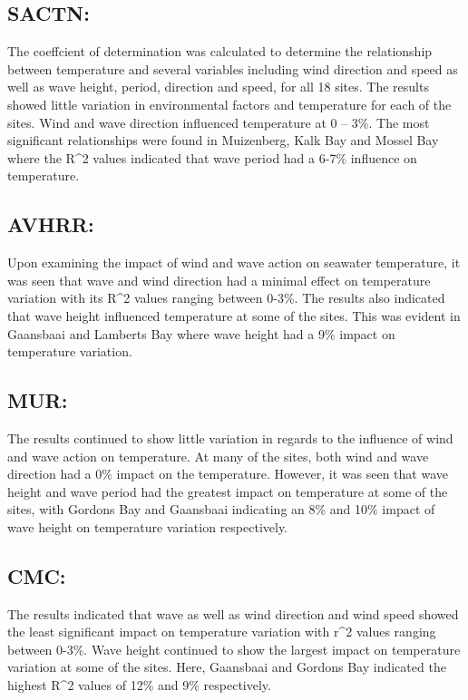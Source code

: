 \documentclass[12pt,]{article}
\begin{document}
\subsection{SACTN:}\label{sactn}

The coeffcient of determination was calculated to determine the
relationship between temperature and several variables including wind
direction and speed as well as wave height, period, direction and speed,
for all 18 sites. The results showed little variation in environmental
factors and temperature for each of the sites. Wind and wave direction
influenced temperature at 0 -- 3\%. The most significant relationships
were found in Muizenberg, Kalk Bay and Mossel Bay where the R\^{}2
values indicated that wave period had a 6-7\% influence on temperature.

\subsection{AVHRR:}\label{avhrr}

Upon examining the impact of wind and wave action on seawater
temperature, it was seen that wave and wind direction had a minimal
effect on temperature variation with its R\^{}2 values ranging between
0-3\%. The results also indicated that wave height influenced
temperature at some of the sites. This was evident in Gaansbaai and
Lamberts Bay where wave height had a 9\% impact on temperature
variation.

\subsection{MUR:}\label{mur}

The results continued to show little variation in regards to the
influence of wind and wave action on temperature. At many of the sites,
both wind and wave direction had a 0\% impact on the temperature.
However, it was seen that wave height and wave period had the greatest
impact on temperature at some of the sites, with Gordons Bay and
Gaansbaai indicating an 8\% and 10\% impact of wave height on
temperature variation respectively.

\subsection{CMC:}\label{cmc}

The results indicated that wave as well as wind direction and wind speed
showed the least significant impact on temperature variation with r\^{}2
values ranging between 0-3\%. Wave height continued to show the largest
impact on temperature variation at some of the sites. Here, Gaansbaai
and Gordons Bay indicated the highest R\^{}2 values of 12\% and 9\%
respectively.
\end{document}
